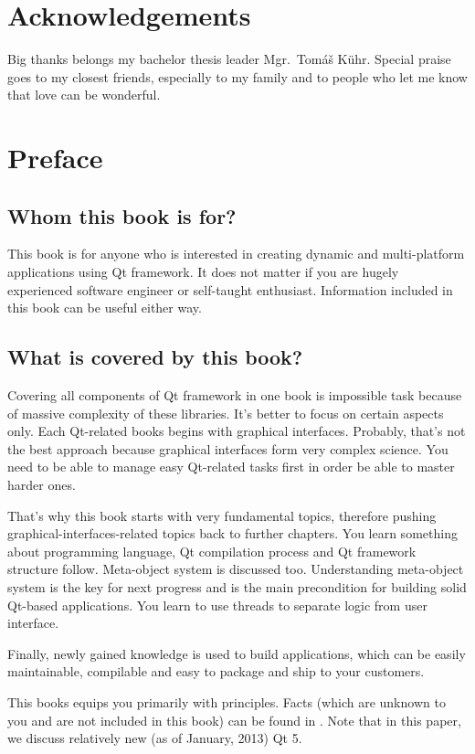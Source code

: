 \section*{Acknowledgements}
Big thanks belongs my bachelor thesis leader Mgr.~Tomáš Kühr. Special praise goes to my closest friends, especially to my family and to people who let me know that love can be wonderful.

\clearpage

\section*{Preface}

\subsection*{Whom this book is for?}
This book is for anyone who is interested in creating dynamic and multi-platform applications using Qt framework. It does not matter if you are hugely experienced software engineer or self-taught enthusiast. Information included in this book can be useful either way.

\subsection*{What is covered by this book?}
Covering all components of Qt framework in one book is impossible task because of massive complexity of these libraries. It's better to focus on certain aspects only. Each Qt-related books begins with graphical interfaces. Probably, that's not the best approach because graphical interfaces form very complex science. You need to be able to manage easy Qt-related tasks first in order be able to master harder ones.

That's why this book starts with very fundamental topics, therefore pushing graphical-interfaces-related topics back to further chapters. You learn something about \cpp programming language, Qt compilation process and Qt framework structure follow. Meta-object system is discussed too. Understanding meta-object system is the key for next progress and is the main precondition for building solid Qt-based applications. You learn to use threads to separate logic from user interface.

Finally, newly gained knowledge is used to build applications, which can be easily maintainable, compilable and easy to package and ship to your customers.

This books equips you primarily with principles. Facts (which are unknown to you and are not included in this book) can be found in \citep{various:qtdoc}. Note that in this paper, we discuss relatively new (as of January, 2013) Qt 5.

